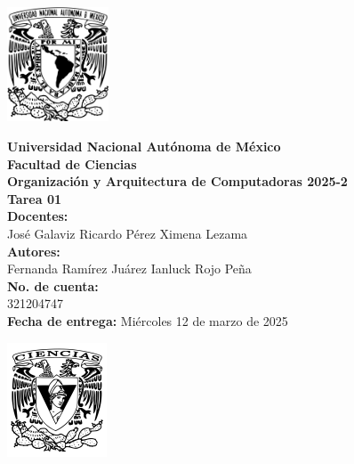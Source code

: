 \documentclass[12pt,letterpaper]{article}
\begin{document}
\begin{center}
  \begin{minipage}{3cm}
    \begin{center}
      \includegraphics[height=3.4cm]{../unam_logo.png}
    \end{center}
  \end{minipage}\hfill
  \begin{minipage}{10cm}
    \begin{center}
      \textbf{\Large Universidad Nacional Autónoma de México}\\[0.2cm]
      \textbf{\large Facultad de Ciencias}\\[0.2cm]
      \textbf{Organización y Arquitectura de Computadoras 2025-2}\\[0.4cm]
      \textbf{\Large Tarea 01}\\[0.1cm]
      \textbf{Docentes:}\\
      José Galaviz \hspace{1em} Ricardo Pérez \hspace{1em} Ximena Lezama\\[0.3cm]
      \textbf{Autores:}\\
      Fernanda Ramírez Juárez \quad Ianluck Rojo Peña\\[0.2cm]
      \textbf{No. de cuenta:}\\
      321204747 \\[0.2cm]
      \textbf{Fecha de entrega:} Miércoles 12 de marzo de 2025
    \end{center}
  \end{minipage}\hfill
  \begin{minipage}{3cm}
    \begin{center}
      \includegraphics[height=3.4cm]{../fc_logo.png}
    \end{center}
  \end{minipage}
\end{center}
\end{document}
